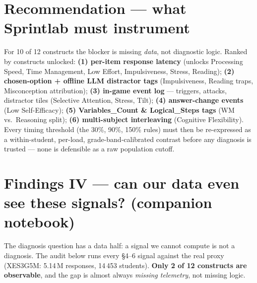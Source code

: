 \documentclass[10pt]{article}
\begin{document}
\section{Recommendation --- what Sprintlab must instrument}
For 10 of 12 constructs the blocker is missing \emph{data}, not diagnostic logic. Ranked by constructs unlocked: \;\textbf{(1) per-item response latency} (unlocks Processing Speed, Time Management, Low Effort, Impulsiveness, Stress, Reading); \;\textbf{(2) chosen-option + offline LLM distractor tags} (Impulsiveness, Reading traps, Misconception attribution); \;\textbf{(3) in-game event log} --- triggers, attacks, distractor tiles (Selective Attention, Stress, Tilt); \;\textbf{(4) answer-change events} (Low Self-Efficacy); \;\textbf{(5) Variables\_Count \& Logical\_Steps tags} (WM vs.\ Reasoning split); \;\textbf{(6) multi-subject interleaving} (Cognitive Flexibility). Every timing threshold (the 30\%, 90\%, 150\% rules) must then be re-expressed as a within-student, per-load, grade-band-calibrated contrast before any diagnosis is trusted --- none is defensible as a raw population cutoff.

\newpage
\section{Findings IV --- can our data even see these signals? (companion notebook)}
The diagnosis question has a data half: a signal we cannot compute is not a diagnosis. The audit below runs every \S4--6 signal against the real proxy (XES3G5M: 5.14\,M responses, 14\,453 students). \textbf{Only 2 of 12 constructs are observable}, and the gap is almost always \emph{missing telemetry}, not missing logic.
\end{document}
